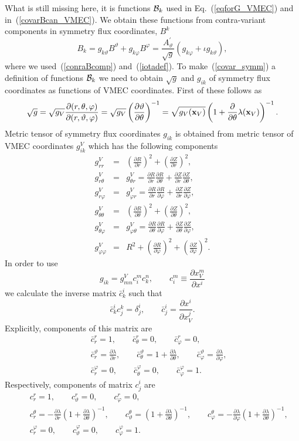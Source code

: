 \documentclass[12pt]{article}
\newcommand{\be}[1]{\begin{equation} \label{#1}}
\newcommand{\ee}{\end{equation}}
\newcommand{\bea}[1]{\begin{eqnarray} \label{#1}}
\newcommand{\eea}{\end{eqnarray}}
\newcommand{\eq}[1]{(\ref{#1})}
\newcommand{\difp}[2]{\frac{\partial #1}{\partial #2}}
\newcommand{\bx}{{\bf x}}
\newcommand{\cB}{{\cal B}}
\begin{document}
\noindent
What is still missing here, it is functions $\cB_k$ used in Eq.~\eq{eqforG_VMEC} and in~\eq{covarBcan_VMEC}. 
We obtain these functions from contra-variant components in symmetry flux coordinates, $B^k$
\be{covar_symm}
B_k = g_{k\vartheta} B^\vartheta+g_{k\varphi} B^\varphi
=\frac{A^\prime_\vartheta}{\sqrt{g}}\left(g_{k\varphi}+\iota g_{k\vartheta}\right),
\ee
where we used~\eq{conraBcomp} and~\eq{iotadef}. To make~\eq{covar_symm} a definition of functions $\cB_k$
we need to obtain $\sqrt{g}$ and $g_{ik}$ of symmetry flux coordinates as functions of VMEC coordinates.
First of these follows as
\be{sqg_sym}
\sqrt{g}=\sqrt{g_V}\difp{(r,\theta,\varphi)}{(r,\vartheta,\varphi)}
= \sqrt{g_V}\left(\difp{\vartheta}{\theta}\right)^{-1}
= \sqrt{g_V(\bx_V)}\left(1+\difp{}{\theta}\lambda(\bx_V)\right)^{-1}.
\ee
Metric tensor of symmetry flux coordinates $g_{ik}$ is obtained from metric tensor of VMEC coordinates $g_{ik}^V$
which has the following components
\bea{gik_VMEC}
g^V_{rr} &=& \left(\difp{R}{r}\right)^2+\left(\difp{Z}{r}\right)^2,
\nonumber \\
g^V_{r\theta} &=& g^V_{\theta r} = \difp{R}{r}\difp{R}{\theta}+\difp{Z}{r}\difp{Z}{\theta},
\nonumber \\
g^V_{r\varphi} &=& g^V_{\varphi r} = \difp{R}{r}\difp{R}{\varphi}+\difp{Z}{r}\difp{Z}{\varphi},
\nonumber \\
g^V_{\theta\theta} &=& \left(\difp{R}{\theta}\right)^2+\left(\difp{Z}{\theta}\right)^2,
\nonumber \\
g^V_{\theta\varphi} &=& g^V_{\varphi \theta} = \difp{R}{\theta}\difp{R}{\varphi}+\difp{Z}{\theta}\difp{Z}{\varphi},
\nonumber \\
g^V_{\varphi\varphi} &=& R^2+\left(\difp{R}{\varphi}\right)^2+\left(\difp{Z}{\varphi}\right)^2.
\eea
In order to use
\be{transV-c}
g_{ik}=g_{mn}^V c^m_i c^n_k, \qquad c^m_i \equiv \difp{x_V^m}{x^i}
\ee
we calculate the inverse matrix $\bar c^i_k$ such that
\be{invmatc}
\bar c^i_k c^k_j = \delta^i_j, \qquad \bar c^i_j = \difp{x^i}{x_V^j}.
\ee
Explicitly, components of this matrix are
\bea{cbar_elements}
& & \bar c^r_r=1, \qquad \bar c^r_\theta=0, \qquad \bar c^r_\varphi=0,
\nonumber \\
& & \bar c^\vartheta_r=\difp{\lambda}{r}, 
\qquad \bar c^\vartheta_\theta=1+\difp{\lambda}{\theta}, \qquad \bar c^\vartheta_\varphi=\difp{\lambda}{\varphi},
\nonumber \\
& & \bar c^\varphi_r=0, \qquad \bar c^\varphi_\theta=0, \qquad \bar c^\varphi_\varphi=1.
\eea
Respectively, components of matrix $c^i_j$ are
\bea{c_elements}
& & c^r_r=1, \qquad c^r_\vartheta=0, \qquad c^r_\varphi=0,
\nonumber \\
& & c^\theta_r=-\difp{\lambda}{r}\left(1+\difp{\lambda}{\theta}\right)^{-1}, 
\qquad c^\theta_\vartheta=\left(1+\difp{\lambda}{\theta}\right)^{-1}, 
\qquad c^\theta_\varphi=-\difp{\lambda}{\varphi}\left(1+\difp{\lambda}{\theta}\right)^{-1},
\nonumber \\
& & c^\varphi_r=0, \qquad c^\varphi_\vartheta=0, \qquad c^\varphi_\varphi=1.
\eea
\end{document}
